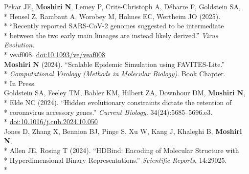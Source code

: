 \documentclass[margin,line]{res}
\begin{document}
\begin{resume}
\hspace*{4mm} Pekar JE, \textbf{Moshiri N}, Lemey P, Crits-Christoph A, D\'ebarre F, Goldstein SA,\\*
\hspace*{9.5mm} Hensel Z, Rambaut A, Worobey M, Holmes EC, Wertheim JO (2025).\\*
\hspace*{9.5mm} ``Recently reported SARS-CoV-2 genomes suggested to be intermediate\\*
\hspace*{9.5mm} between the two early main lineages are instead likely derived.'' \textit{Virus Evolution}.\\*\vspace{2mm}
\hspace*{7mm} veaf008. \href{https://doi.org/10.1093/ve/veaf008}{doi:10.1093/ve/veaf008}\\
\hspace*{4mm} \textbf{Moshiri N} (2024). ``Scalable Epidemic Simulation using FAVITES-Lite.''\\*
\hspace*{9.5mm} \textit{Computational Virology (Methods in Molecular Biology)}. Book Chapter.\\*\vspace{2mm}
\hspace*{8mm} In Press.\\
\hspace*{4mm} Goldstein SA, Feeley TM, Babler KM, Hilbert ZA, Downhour DM, \textbf{Moshiri N},\\*
\hspace*{9.5mm} Elde NC (2024). ``Hidden evolutionary constraints dictate the retention of\\*
\hspace*{9.5mm} coronavirus accessory genes.'' \textit{Current Biology}. 34(24):5685--5696.e3.\\*\vspace{2mm}
\hspace*{8mm} \href{https://doi.org/10.1016/j.cub.2024.10.050}{doi:10.1016/j.cub.2024.10.050}\\
\hspace*{4mm} Jones D, Zhang X, Bennion BJ, Pinge S, Xu W, Kang J, Khaleghi B, \textbf{Moshiri N},\\*
\hspace*{9.5mm} Allen JE, Rosing T (2024). ``HDBind: Encoding of Molecular Structure with\\*
\hspace*{9.5mm} Hyperdimensional Binary Representations.'' \textit{Scientific Reports}. 14:29025.\\*\vspace{2mm}

\end{resume}
\end{document}
